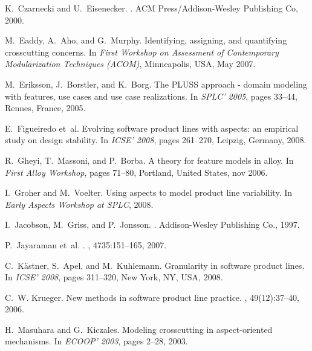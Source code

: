 \documentclass{sig-alt-full}
\begin{document}
\begin{thebibliography}{10}
K.~Czarnecki and U.~Eisenecker.
.
\newblock ACM Press/Addison-Wesley Publishing Co, 2000.

M.~Eaddy, A.~Aho, and G.~Murphy.
\newblock Identifying, assigning, and quantifying crosscutting concerns.
\newblock In {\em First {W}orkshop on {A}ssessment of {C}ontemporary
  {M}odularization {T}echniques (ACOM)}, Minneapolis, USA, May 2007.

M.~Eriksson, J.~Borstler, and K.~Borg.
\newblock The {PLUSS} approach - domain modeling with features, use cases and
  use case realizations.
\newblock In {\em SPLC' 2005}, pages 33--44, Rennes, France, 2005.

E.~Figueiredo et~al.
\newblock Evolving software product lines with aspects: an empirical study on
  design stability.
\newblock In {\em ICSE' 2008}, pages 261--270, Leipzig, Germany, 2008.

R.~Gheyi, T.~Massoni, and P.~Borba.
\newblock A theory for feature models in alloy.
\newblock In {\em First Alloy Workshop}, pages 71--80, Portland, United States,
  nov 2006.

I.~Groher and M.~Voelter.
\newblock Using aspects to model product line variability.
\newblock In {\em Early Aspects Workshop at SPLC}, 2008.

I.~Jacobson, M.~Griss, and P.~Jonsson.
.
\newblock Addison-Wesley Publishing Co., 1997.

P.~Jayaraman et~al.
.
, 4735:151--165, 2007.

C.~K\"{a}stner, S.~Apel, and M.~Kuhlemann.
\newblock Granularity in software product lines.
\newblock In {\em ICSE' 2008}, pages 311--320, New York, NY, USA, 2008.

C.~W. Krueger.
\newblock New methods in software product line practice.
, 49(12):37--40, 2006.

H.~Masuhara and G.~Kiczales.
\newblock Modeling crosscutting in aspect-oriented mechanisms.
\newblock In {\em ECOOP' 2003}, pages 2--28, 2003.


\end{thebibliography}
\end{document}
